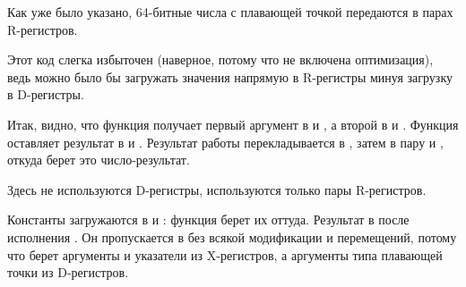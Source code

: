 \label{FPU_passing_floats_ARM}



Как уже было указано, 64-битные числа с плавающей точкой передаются в парах R-регистров.

Этот код слегка избыточен (наверное, потому что не включена оптимизация), ведь можно было бы 
загружать значения напрямую в R-регистры минуя загрузку в D-регистры.

Итак, видно, что функция  получает первый аргумент в  и , а второй в  и . 
Функция оставляет результат в  и .
Результат работы  перекладывается в , 
затем в пару  и , откуда 
\printf берет это число-результат.




Здесь не используются D-регистры, используются только пары R-регистров.




Константы загружаются в  и : 
функция  берет их оттуда.
Результат в  после исполнения .
Он пропускается в \printf без всякой модификации и перемещений, 
потому что \printf берет аргументы  и указатели 
из X-регистров, а аргументы типа плавающей точки из D-регистров.

